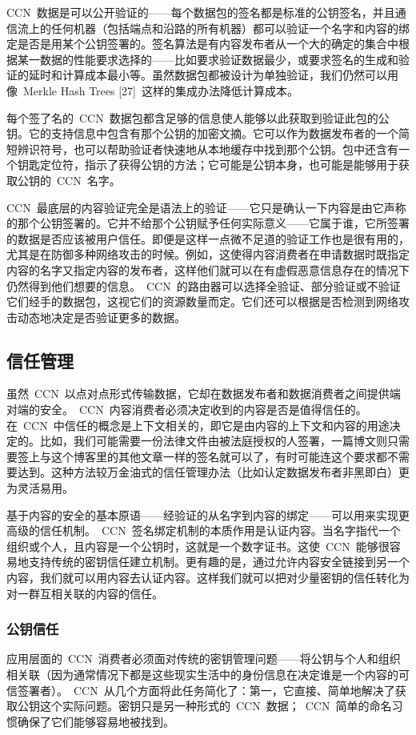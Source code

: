 CCN~数据是可以公开验证的——每个数据包的签名都是标准的公钥签名，并且通信流上的任何机器（包括端点和沿路的所有机器）都可以验证一个名字和内容的绑定是否是用某个公钥签署的。签名算法是有内容发布者从一个大的确定的集合中根据某一数据的性能要求选择的——比如要求验证数据最少，或要求签名的生成和验证的延时和计算成本最小等。虽然数据包都被设计为单独验证，我们仍然可以用像~Merkle Hash Trees [27]~这样的集成办法降低计算成本。

每个签了名的~CCN~数据包都含足够的信息使人能够以此获取到验证此包的公钥。它的支持信息中包含有那个公钥的加密文摘。它可以作为数据发布者的一个简短辨识符号，也可以帮助验证者快速地从本地缓存中找到那个公钥。包中还含有一个钥匙定位符，指示了获得公钥的方法；它可能是公钥本身，也可能是能够用于获取公钥的~CCN~名字。

CCN~最底层的内容验证完全是语法上的验证——它只是确认一下内容是由它声称的那个公钥签署的。它并不给那个公钥赋予任何实际意义——它属于谁，它所签署的数据是否应该被用户信任。即便是这样一点微不足道的验证工作也是很有用的，尤其是在防御多种网络攻击的时候。例如，这使得内容消费者在申请数据时既指定内容的名字又指定内容的发布者，这样他们就可以在有虚假恶意信息存在的情况下仍然得到他们想要的信息。~CCN~的路由器可以选择全验证、部分验证或不验证它们经手的数据包，这视它们的资源数量而定。它们还可以根据是否检测到网络攻击动态地决定是否验证更多的数据。

\subsection{信任管理}
\label{sec:5.2}
虽然~CCN~以点对点形式传输数据，它却在数据发布者和数据消费者之间提供端对端的安全。~CCN~内容消费者必须决定收到的内容是否是值得信任的。在~CCN~中信任的概念是上下文相关的，即它是由内容的上下文和内容的用途决定的。比如，我们可能需要一份法律文件由被法庭授权的人签署，一篇博文则只需要签上与这个博客里的其他文章一样的签名就可以了，有时可能连这个要求都不需要达到。这种方法较万金油式的信任管理办法（比如认定数据发布者非黑即白）更为灵活易用。

基于内容的安全的基本原语——经验证的从名字到内容的绑定——可以用来实现更高级的信任机制。~CCN~签名绑定机制的本质作用是认证内容。当名字指代一个组织或个人，且内容是一个公钥时，这就是一个数字证书。这使~CCN~能够很容易地支持传统的密钥信任建立机制。更有趣的是，通过允许内容安全链接到另一个内容，我们就可以用内容去认证内容。这样我们就可以把对少量密钥的信任转化为对一群互相关联的内容的信任。

\subsubsection{公钥信任}
\label{sec:5.2.1}
应用层面的~CCN~消费者必须面对传统的密钥管理问题——将公钥与个人和组织相关联（因为通常情况下都是这些现实生活中的身份信息在决定谁是一个内容的可信签署者）。~CCN~从几个方面将此任务简化了：第一，它直接、简单地解决了获取公钥这个实际问题。密钥只是另一种形式的~CCN~数据；~CCN~简单的命名习惯确保了它们能够容易地被找到。

